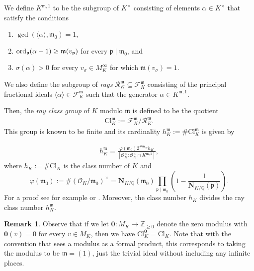 \documentclass[11pt, reqno]{amsart}
\numberwithin{equation}{section}
\newcommand{\Z}{\mathbb{Z}}
\newcommand{\Q}{\mathbb{Q}}
\newcommand{\ord}[1]{\operatorname{ord}#1}
\newcommand{\Nrm}[2]{\mathbf{N}_{#1}(#2)}
\theoremstyle{definition}
\newtheorem{remark}[theorem]{Remark}
\begin{document}
We define $K^{\mathfrak{m},1}$ to be the subgroup of $K^{\times}$ consisting of elements $\alpha \in K^{\times}$ that satisfy the conditions
\begin{enumerate}
\item $\gcd{(\langle \alpha \rangle, \mathfrak{m}_0)} = 1$,
\item $\ord_\mathfrak{p}(\alpha - 1) \geq \mathfrak{m}(v_{\mathfrak{p}})$ for every $\mathfrak{p} \mid \mathfrak{m}_0$, and
\item $\sigma(\alpha) > 0$ for every $v_{\sigma} \in M_K^{\infty}$ for which $\mathfrak{m}(v_{\sigma}) = 1$.
\end{enumerate}
We also define the subgroup of \emph{rays} $\mathcal{R}_K^{\mathfrak{m}} \subseteq \mathcal{F}_K^{\mathfrak{m}}$ consisting of the principal fractional ideals $\langle \alpha \rangle \in \mathcal{F}_K^{\mathfrak{m}}$ such that the generator $\alpha \in K^{\mathfrak{m}, 1}$.


Then, the \textit{ray class group} of $K$ modulo $\mathfrak{m}$ is defined to be the quotient
\begin{align*}
\mathrm{Cl}_K^{\mathfrak{m}}:=\mathcal{F}_K^{\mathfrak{m}} / \mathcal{R}_K^{\mathfrak{m}}.
\end{align*}
This group is known to be finite and its cardinality $h_K^{\mathfrak{m}}:=\# \mathrm{Cl}_K^{\mathfrak{m}}$ is given by 

\begin{align}\label{eqn:ray-class-number-formula}
h_K^{\mathfrak{m}} = \frac{\varphi(\mathfrak{m}_0) 2^{\#\mathfrak{m}_{\infty}} h_K}{\left[\mathcal{O}_K^{\times}: \mathcal{O}_K^{\times} \cap K^{\mathfrak{m}, 1}\right]},
\end{align}
where $h_K:=\# \mathrm{Cl}_K$ is the class number of $K$ and
$$
\varphi(\mathfrak{m}_0) := \#\left(\mathcal{O}_K / \mathfrak{m}_0\right)^{\times}= \Nrm{K/\Q}{\mathfrak{m}_0} \prod_{\mathfrak{p} \mid \mathfrak{m}_0}\left( 1 - \frac{1}{\Nrm{K/\Q}{\mathfrak{p}}} \right).
$$
For a proof see for example \cite[Chap. VI, \S 1, Thm. 1]{Lan94} or \cite[Corollary 21.9]{Sut21}. Moreover, the class number $h_K$ divides the ray class number $h_K^{\mathfrak{m}}$.

\begin{remark}
Observe that if we let $\mathbf{0} \colon M_K \longrightarrow \Z_{\geq 0}$ denote the zero modulus with $\mathbf{0}(v) = 0$ for every $v \in M_K$, then we have $\mathrm{Cl}_K^{\mathbf{0}} = \mathrm{Cl}_K$. Note that with the convention that sees a modulus as a formal product, this corresponds to taking the modulus to be $\mathfrak{m} = (1)$, just the trivial ideal without including any infinite places.
\end{remark}
\end{document}
